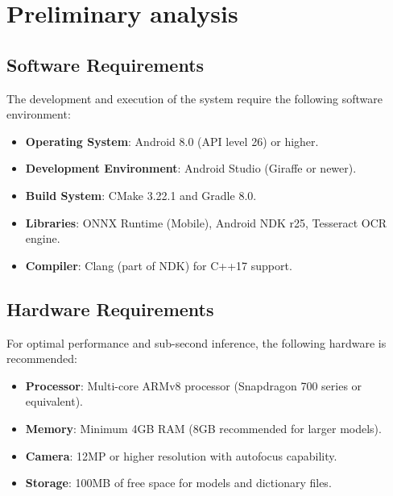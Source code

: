 \chapter{Preliminary analysis}
\section{Software Requirements}
The development and execution of the system require the following software environment:
\begin{itemize}
    \item \textbf{Operating System}: Android 8.0 (API level 26) or higher.
    \item \textbf{Development Environment}: Android Studio (Giraffe or newer).
    \item \textbf{Build System}: CMake 3.22.1 and Gradle 8.0.
    \item \textbf{Libraries}: ONNX Runtime (Mobile), Android NDK r25, Tesseract OCR engine.
    \item \textbf{Compiler}: Clang (part of NDK) for C++17 support.
\end{itemize}

\section{Hardware Requirements}
For optimal performance and sub-second inference, the following hardware is recommended:
\begin{itemize}
    \item \textbf{Processor}: Multi-core ARMv8 processor (Snapdragon 700 series or equivalent).
    \item \textbf{Memory}: Minimum 4GB RAM (8GB recommended for larger models).
    \item \textbf{Camera}: 12MP or higher resolution with autofocus capability.
    \item \textbf{Storage}: 100MB of free space for models and dictionary files.
\end{itemize}
